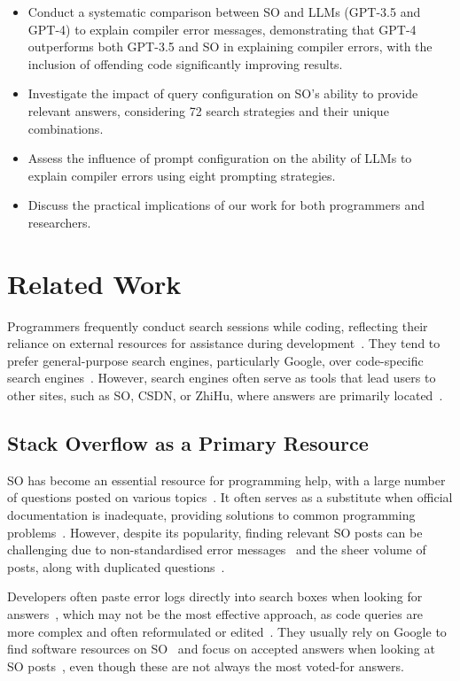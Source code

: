 \documentclass[preprint,12pt]{elsarticle}
\begin{document}
\begin{itemize}
\item Conduct a systematic comparison between SO and LLMs (GPT-3.5 and GPT-4) to explain compiler error messages, demonstrating that GPT-4 outperforms both GPT-3.5 and SO in explaining compiler errors, with the inclusion of offending code significantly improving results.
\item Investigate the impact of query configuration on SO's ability to provide relevant answers, considering 72 search strategies and their unique combinations.
\item Assess the influence of prompt configuration on the ability of LLMs to explain compiler errors using eight prompting strategies.
\item Discuss the practical implications of our work for both programmers and researchers.
\end{itemize}

\section{Related Work}
\label{sec:related work}

Programmers frequently conduct search sessions while coding, reflecting their reliance on external resources for assistance during development~\cite{r3}. They tend to prefer general-purpose search engines, particularly Google, over code-specific search engines~\cite{r2, r4, r5, r6}. However, search engines often serve as tools that lead users to other sites, such as SO, CSDN, or ZhiHu, where answers are primarily located~\cite{r2}.

\subsection{Stack Overflow as a Primary Resource}

SO has become an essential resource for programming help, with a large number of questions posted on various topics~\cite{r3}. It often serves as a substitute when official documentation is inadequate, providing solutions to common programming problems~\cite{r8}. However, despite its popularity, finding relevant SO posts can be challenging due to non-standardised error messages~\cite{r1, r11} and the sheer volume of posts, along with duplicated questions~\cite{r7, r12, r13}.

Developers often paste error logs directly into search boxes when looking for answers~\cite{r13}, which may not be the most effective approach, as code queries are more complex and often reformulated or edited~\cite{r3, r5}. They usually rely on Google to find software resources on SO~\cite{r10, r14} and focus on accepted answers when looking at SO posts~\cite{r6, r15, r16}, even though these are not always the most voted-for answers.
\end{document}
